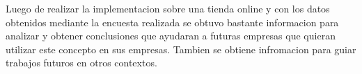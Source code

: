 Luego de realizar la implementacion {\GAM} sobre una tienda online y con los datos obtenidos mediante
la encuesta realizada se obtuvo bastante informacion para analizar y obtener conclusiones que ayudaran 
a futuras empresas que quieran utilizar este concepto en sus empresas. Tambien se obtiene infromacion
para guiar trabajos futuros en otros contextos.
